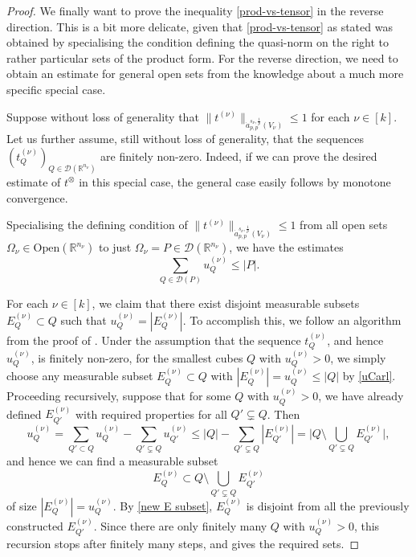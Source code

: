 \documentclass[11pt, reqno]{amsart}
\theoremstyle{definition}
\theoremstyle{remark}
\numberwithin{equation}{section}
\newcommand{\D}{\mathscr D}
\newcommand{\R}{\mathbb R}
\newcommand{\abs}[1]{|#1|}
\newcommand{\Babs}[1]{\Big|#1\Big|}
\newcommand{\Norm}[2]{\|#1\|_{#2}}
\newcommand{\Open}{\mathrm{Open}}
\begin{document}
\begin{proof}
We finally want to prove the inequality \eqref{prod-vs-tensor} in the reverse direction. This is a bit more delicate, given that \eqref{prod-vs-tensor} as stated was obtained by specialising the condition defining the quasi-norm on the right to rather particular sets of the product form. For the reverse direction, we need to obtain an estimate for general open sets from the knowledge about a much more specific special case.

Suppose without loss of generality that $\Norm{t^{(\nu)}}{\dot a^{s_\nu,\frac{1}{p}}_{p,p}(V_\nu)}\leq 1$ for each $\nu\in[k]$. Let us further assume, still without loss of generality, that the sequences $(t^{(\nu)}_Q)_{Q\in\D(\R^{n_\nu})}$ are finitely non-zero. Indeed, if we can prove the desired estimate of $t^{\otimes}$ in this special case, the general case easily follows by monotone convergence.

Specialising the defining condition of $\Norm{t^{(\nu)}}{\dot a^{s_\nu,\frac1p}_{p,p}(V_\nu)}\leq 1$ from all open sets $\Omega_\nu\in\Open(\R^{n_\nu})$ to just $\Omega_\nu=P\in\D(\R^{n_\nu})$, we have the estimates
\begin{equation}\label{uCarl}
\sum_{Q\in\D(P)}u_Q^{(\nu)}\leq\abs{P}.
\end{equation}

For each $\nu\in[k]$, we claim that there exist disjoint measurable subsets $E_Q^{(\nu)}\subset Q$ such that $u_Q^{(\nu)}=\abs{E_Q^{(\nu)}}$. To accomplish this, we follow an algorithm from the proof of \cite[Lemma 6.3]{LN:basics}. Under the assumption that the sequence $t^{(\nu)}_Q$, and hence $u^{(\nu)}_Q$, is finitely non-zero, for the smallest cubes $Q$ with $u_Q^{(\nu)}>0$, we simply choose any measurable subset $E^{(\nu)}_Q\subset Q$ with $\abs{E^{(\nu)}_Q}=u_Q^{(\nu)}\leq\abs{Q}$ by \eqref{uCarl}. Proceeding recursively, suppose that for some $Q$ with $u_Q^{(\nu)}>0$, we have already defined $E^{(\nu)}_{Q'}$ with required properties for all $Q'\subsetneq Q$. Then
\begin{equation*}
u_Q^{(\nu)}=
\sum_{Q'\subset Q} u^{(\nu)}_Q  -\sum_{Q'\subsetneq Q}u^{(\nu)}_{Q'}
\leq\abs{Q}-\sum_{Q'\subsetneq Q}\abs{E^{(\nu)}_{Q'}}
=\Babs{Q\setminus\bigcup_{Q'\subsetneq Q}E^{(\nu)}_{Q'}},
\end{equation*}
and hence we can find a measurable subset
\begin{equation}\label{new E subset}
E^{(\nu)}_Q\subset Q\setminus\bigcup_{Q'\subsetneq Q}E^{(\nu)}_{Q'}
\end{equation}
of size
$\abs{E^{(\nu)}_Q}=u_Q^{(\nu)}.$
By \eqref{new E subset}, $E^{(\nu)}_Q$ is disjoint from all the previously constructed $E^{(\nu)}_{Q'}$. Since there are only finitely many $Q$ with $u_Q^{(\nu)}>0$, this recursion stops after finitely many steps, and gives the required sets.


\end{proof}
\end{document}
